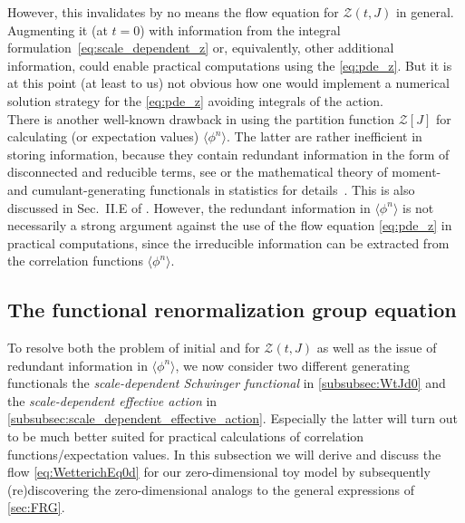 However, this invalidates by no means the flow equation for $\mathcal{Z} ( t, J )$ in general.
Augmenting it (at $t = 0$) with information from the integral formulation~\eqref{eq:scale_dependent_z} or, equivalently, other additional information, could enable practical computations using the \pde{} \eqref{eq:pde_z}.
But it is at this point (at least to us) not obvious how one would implement a numerical solution strategy for the \pde{} \eqref{eq:pde_z} avoiding integrals of the action.\\

There is another well-known drawback in using the partition function $\mathcal{Z} [ J ]$ for calculating \nptFunctions{} (or expectation values) $\langle \phi^n \rangle$.
The latter are rather inefficient in storing information, because they contain redundant information in the form of disconnected and reducible terms, see  or the mathematical theory of moment- and cumulant-generating functionals in statistics for details~\cite{McCullagh:2009}.
This is also discussed in Sec.~II.E of .
However, the redundant information in $\langle \phi^n \rangle$ is not necessarily a strong argument against the use of the flow equation \eqref{eq:pde_z} in practical computations, since the irreducible information can be extracted from the correlation functions $\langle \phi^n \rangle$.\bigskip

\subsection{The functional renormalization group equation}\label{subsec:exact_rg_equation}
To resolve both the problem of initial and \bcs{} for $\mathcal{Z}(t,J)$ as well as the issue of redundant information in $\langle \phi^n \rangle$, we now consider two different generating functionals the \textit{scale-dependent Schwinger functional} in \cref{subsubsec:WtJd0} and the \textit{scale-dependent effective action} in \cref{subsubsec:scale_dependent_effective_action}. 
Especially the latter will turn out to be much better suited for practical calculations of correlation functions/expectation values.
In this subsection we will derive and discuss the \frg{} flow \cref{eq:WetterichEq0d} for our zero-dimensional toy model \qft{} by subsequently (re)discovering the zero-dimensional analogs to the general expressions of \cref{sec:FRG}.
	
